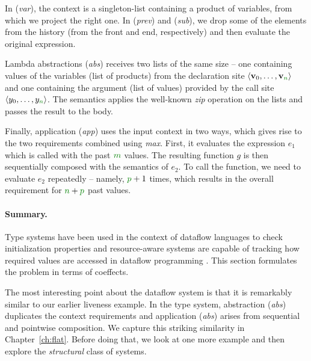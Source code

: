In (\emph{var}), the context is a singleton-list containing a product of variables, from which
we project the right one. In (\emph{prev}) and (\emph{sub}), we drop some of the elements from
the history (from the front and end, respectively) and then evaluate the original expression.

Lambda abstractions (\emph{abs}) receives two lists of the same size -- one containing values of
the variables (list of products) from the declaration site $\langle \mathbf{v}_0, \ldots, \mathbf{v}_{\cclrd{n}} \rangle$
and one containing the argument (list of values) provided by the call site $\langle y_0, \ldots, y_{\cclrd{n}} \rangle$.
The semantics applies the well-known \emph{zip} operation on the lists and passes the result to the
body.

Finally, application (\emph{app}) uses the input context in two ways, which gives rise to the
two requirements combined using \emph{max}. First, it evaluates the expression $e_1$ which is
called with the past $\cclrd{m}$ values. The resulting function $g$ is then sequentially composed
with the semantics of $e_2$. To call the function, we need to evaluate $e_2$ repeatedly -- namely,
$\cclrd{p}+1$ times, which results in the overall requirement for $\cclrd{n}+\cclrd{p}$ past values.

\paragraph{Summary.}
Type systems have been used in the context of dataflow languages to check
initialization properties \cite{app-dataflow-init} and resource-aware systems are capable
of tracking how required values are accessed in dataflow programming \cite{app-pixie}.
This section formulates the problem in terms of coeffects.

The most interesting point about the dataflow system is that it is remarkably similar to our
earlier liveness example. In the type system, abstraction (\emph{abs}) duplicates the context
requirements and application (\emph{abs}) arises from sequential and pointwise composition.
We capture this striking similarity in Chapter~\ref{ch:flat}. Before doing that, we look at one
more example and then explore the \emph{structural} class of systems.


